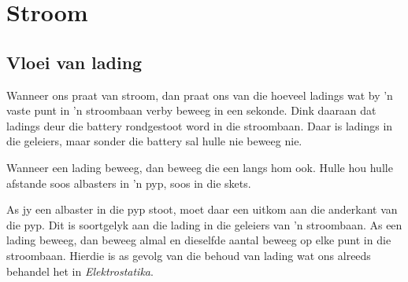 \section{Stroom}

\subsection*{Vloei van lading}

Wanneer ons praat van stroom, dan praat ons van die hoeveel ladings wat by 'n vaste punt
in 'n stroombaan verby beweeg in een sekonde. Dink daaraan dat ladings deur die
battery rondgestoot word in die stroombaan. Daar is ladings in die geleiers,
maar sonder die battery sal hulle nie beweeg nie.\\
\begin{minipage}{.5\textwidth}
Wanneer een lading beweeg, dan beweeg die een langs hom ook. Hulle hou hulle
afstande soos albasters in 'n pyp, soos in die skets.
\begin{center}
\end{center}
As jy een albaster in die pyp stoot, moet daar een uitkom aan die anderkant van
die pyp. Dit is soortgelyk aan die lading in die geleiers van 'n stroombaan. As
een lading beweeg, dan beweeg almal en dieselfde aantal beweeg op elke punt in
die stroombaan. Hierdie is as gevolg van die behoud van lading wat ons alreeds
behandel het in \textsl{Elektrostatika}.
 \end{minipage}
